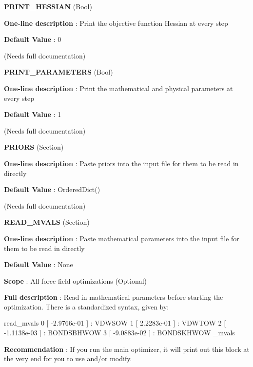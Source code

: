 \begin{DoxyItemize}
\item {\bfseries  P\-R\-I\-N\-T\-\_\-\-H\-E\-S\-S\-I\-A\-N } (Bool) \par
{\bfseries  One-\/line description }\-: Print the objective function Hessian at every step \par
{\bfseries  Default Value }\-: 0 \par
(Needs full documentation)\end{DoxyItemize}
\begin{DoxyItemize}
\item {\bfseries  P\-R\-I\-N\-T\-\_\-\-P\-A\-R\-A\-M\-E\-T\-E\-R\-S } (Bool) \par
{\bfseries  One-\/line description }\-: Print the mathematical and physical parameters at every step \par
{\bfseries  Default Value }\-: 1 \par
(Needs full documentation)\end{DoxyItemize}
\begin{DoxyItemize}
\item {\bfseries  P\-R\-I\-O\-R\-S } (Section) \par
{\bfseries  One-\/line description }\-: Paste priors into the input file for them to be read in directly \par
{\bfseries  Default Value }\-: Ordered\-Dict() \par
(Needs full documentation)\end{DoxyItemize}
\begin{DoxyItemize}
\item {\bfseries  R\-E\-A\-D\-\_\-\-M\-V\-A\-L\-S } (Section) \par
{\bfseries  One-\/line description }\-: Paste mathematical parameters into the input file for them to be read in directly \par
{\bfseries  Default Value }\-: None \par
{\bfseries  Scope }\-: All force field optimizations (Optional) \par
{\bfseries  Full description }\-: Read in mathematical parameters before starting the optimization. There is a standardized syntax, given by\-: \begin{DoxyVerb}read_mvals
0 [ -2.9766e-01 ] : VDWSOW
1 [  2.2283e-01 ] : VDWTOW
2 [ -1.1138e-03 ] : BONDSBHWOW
3 [ -9.0883e-02 ] : BONDSKHWOW
\read_mvals \end{DoxyVerb}
 \par
{\bfseries  Recommendation }\-: If you run the main optimizer, it will print out this block at the very end for you to use and/or modify.\end{DoxyItemize}
